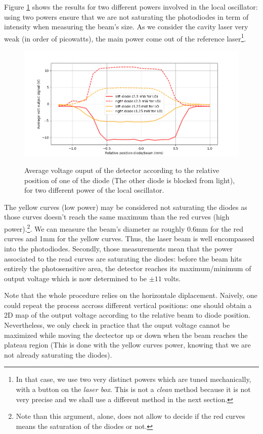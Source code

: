 \documentclass[11pt]{report}
\begin{document}
Figure \ref{fig:diode-size-plot} shows the results for two different powers involved in the local oscillator: using two powers ensure that we are not saturating the photodiodes in term of intensity when measuring the beam's size. As we consider the cavity laser very weak (in order of picowatts), the main power come out of the reference laser\footnote{In that case, we use two very distinct powers which are tuned mechanically, with a button on the \textit{laser box}. This is not a \textit{clean} method because it is not very precise and we shall use a different method in the next section.}.

\begin{figure}[h!]
\caption{Average voltage ouput of the detector according to the relative position of one of the diode (The other diode is blocked from light), for two different power of the local oscillator.}
\centering
\includegraphics[width=\textwidth]{diode-size-plot}
\label{fig:diode-size-plot}
\end{figure}

The yellow curves (low power) may be considered not saturating the diodes as those curves doesn't reach the same maximum than the red curves (high power).\footnote{Note than this argument, alone, does not allow to decide if the red curves means the saturation of the diodes or not.}. We can measure the beam's diameter as roughly 0.6mm for the red curves and 1mm for the yellow curves. Thus, the laser beam is well encompassed into the photodiodes. Secondly, those measurements mean that the power associated to the read curves are saturating the diodes: before the beam hits entirely the photosensitive area, the detector reaches its maximum/minimum of output voltage which is now determined to be $\pm11$ volts.

Note that the whole procedure relies on the horizontale diplacement. Naively, one could repeat the process accross different vertical positions: one should obtain a 2D map of the output voltage according to the relative beam to diode position. Nevertheless, we only check in practice that the ouput voltage cannot be maximized while moving the dectector up or down when the beam reaches the plateau region (This is done with the yellow curves power, knowing that we are not already saturating the diodes).
\end{document}
